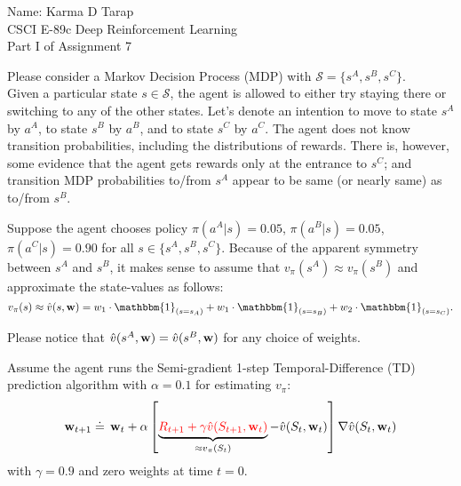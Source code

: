 \documentclass[12pt]{letter}
\begin{document}
\begin{flushleft}
{\sc Name: Karma D Tarap}\\
CSCI E-89c Deep Reinforcement Learning\\
Part I of Assignment 7\\
\end{flushleft}

Please consider a Markov Decision Process (MDP) with  $\mathcal{S}=\{s^{A},s^{B},s^{C}\}$.\medskip\\
Given a particular state $s\in \mathcal{S}$, the agent is allowed to either try staying there or switching to any of the other states. Let's denote an intention to move to state $s^A$ by $a^A$, to state $s^B$ by $a^B$, and to state $s^C$ by $a^C$. The agent does not know transition probabilities, including the distributions of rewards. There is, however, some evidence that the agent gets rewards only at the entrance to $s^{C}$; and transition MDP probabilities to/from $s^{A}$ appear to be same (or nearly same) as to/from $s^{B}$. 

Suppose the agent chooses policy $\pi(a^A|s)=0.05$, $\pi(a^B|s)=0.05$, $\pi(a^C|s)=0.90$ for all $s\in\{s^A,s^B,s^C\}$. Because of the apparent symmetry between $s^A$ and $s^B$, it makes sense to assume that $v_\pi(s^A) \approx v_\pi(s^B)$ and approximate the state-values as follows:
$$v_\pi(s)\approx\hat{v}(s,{\bf w}) = w_1\cdot \mathbbm{1}_{(s=s_A)} + w_1\cdot \mathbbm{1}_{(s=s_B)} + w_2\cdot \mathbbm{1}_{(s=s_C)}.$$ 

Please notice that $\hat{v}(s^A,{\bf w})=\hat{v}(s^B,{\bf w})$ for any choice of weights.

Assume the agent runs the Semi-gradient 1-step Temporal-Difference (TD) prediction algorithm with $\alpha=0.1$ for estimating $v_\pi$:
\begin{equation*}
\begin{aligned}
{\bf w}_{t+1}\doteq \,  {\bf w}_t + \alpha \left[\underbrace{{\color{red}R_{t+1}+\gamma \hat{v}(S_{t+1},{\bf w}_t)}}_{\approx v_\pi(S_t)}-\hat{v}(S_t,{\bf w}_t)\right] \nabla \hat{v}(S_t,{\bf w}_t)
\end{aligned}
\end{equation*}
with $\gamma=0.9$ and zero weights at time $t=0$.
\end{document}

